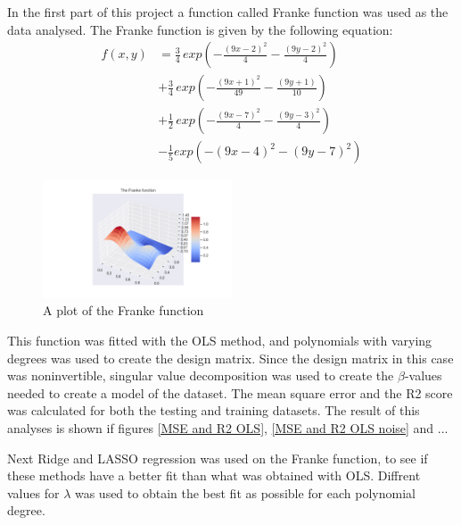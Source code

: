 \thispagestyle{plain}

\noindent In the first part of this project a function called Franke function
 was used as the data analysed. The Franke function is given by the following 
 equation:
\begin{align*}
    f(x,y) &= \frac{3}{4} \, exp\left(- \frac{(9x-2)^2}{4} - \frac{(9y-2)^2}{4}\right) \\
    &+ \frac{3}{4}\, exp\left( - \frac{(9x +1)^2}{49} - \frac{(9y+1)}{10}\right) \\
    &+ \frac{1}{2}\, exp\left( -\frac{(9x-7)^2}{4} - \frac{(9y-3)^2}{4}\right) \\
    &- \frac{1}{5} exp \left( - (9x -4)^2 - (9y-7)^2\right)
\end{align*}
\begin{figure}[H]
	\centering
	\includegraphics[width=0.5\textwidth]{Figure_1.png}
	\caption{\centering A plot of the Franke function }
	\label{Franke function}
\end{figure}
\noindent This function was fitted with the OLS method, 
and polynomials with varying degrees was used to create the design matrix.
Since the design matrix in this case was noninvertible, singular value 
decomposition was used to create the $\beta$-values needed to create a model
of the dataset. The mean square error and the R2 score was calculated 
for both the testing and training datasets. The result of this analyses is 
shown if figures \eqref{MSE and R2 OLS}, \eqref{MSE and R2 OLS noise} and ...

\noindent Next Ridge and LASSO regression was used on the Franke function,
to see if these methods have a better fit than what was obtained with OLS.
Diffrent values for $\lambda$ was used to obtain the best fit as possible for each
polynomial degree.
